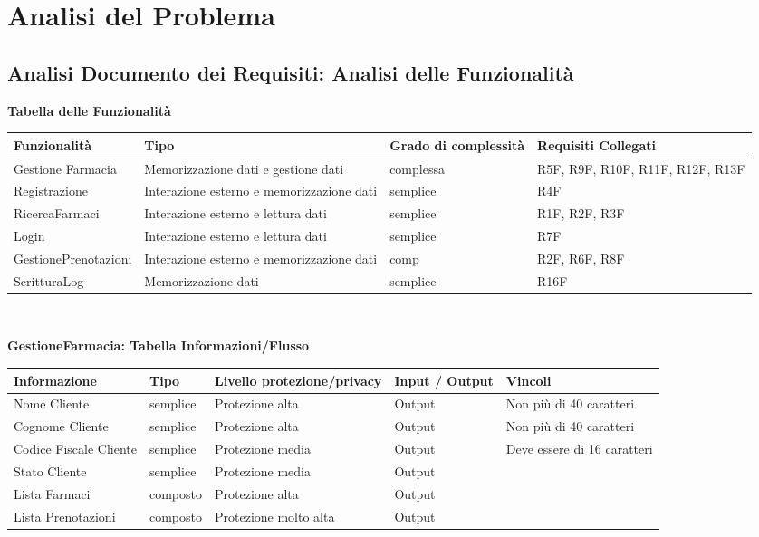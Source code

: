 \newpage
\section{Analisi del Problema}
\subsection{Analisi Documento dei Requisiti: Analisi delle Funzionalità}
\hfill \break

\textbf{Tabella delle Funzionalità}
\hfill \break

\begin{tabular} {|P{4cm}|P{4cm}|P{3.5cm}|P{4cm}|} %
    \hline
    \textbf{Funzionalità} & \textbf{Tipo} & \textbf{Grado di complessità} & \textbf{Requisiti Collegati} \\
    \hline
    Gestione Farmacia & Memorizzazione dati e gestione dati & complessa & R5F, R9F, R10F, R11F, R12F, R13F \\
    \hline
    Registrazione & Interazione esterno e memorizzazione dati & semplice & R4F \\
    \hline
    RicercaFarmaci  &  Interazione esterno e lettura dati  &  semplice  &   R1F, R2F, R3F \\
    \hline
    Login  &  Interazione esterno e lettura dati  &  semplice  &   R7F \\
    \hline
    GestionePrenotazioni  &  Interazione esterno e memorizzazione dati  &  comp  &   R2F, R6F, R8F \\
    \hline
    ScritturaLog  &  Memorizzazione dati  &  semplice  &   R16F \\
    \hline
\end{tabular}
\\
\hfill \break

\textbf{GestioneFarmacia: Tabella Informazioni/Flusso}
\hfill \break

\begin{tabular} {|P{3cm}|P{3cm}|P{3cm}|P{3cm}|P{3cm}|}
    \hline
    \textbf{Informazione} & \textbf{Tipo} & \textbf{Livello protezione/privacy} & \textbf{Input / Output} & \textbf{Vincoli}\\
    \hline
    Nome Cliente & semplice & Protezione alta & Output & Non più di 40 caratteri \\
    \hline
    Cognome Cliente & semplice & Protezione alta & Output & Non più di 40 caratteri \\
    \hline
    Codice Fiscale Cliente & semplice & Protezione media & Output & Deve essere di 16 caratteri \\
    \hline
    Stato Cliente & semplice & Protezione media & Output & \\
    \hline
    Lista Farmaci & composto & Protezione alta & Output & \\
    \hline
    Lista Prenotazioni & composto & Protezione molto alta & Output & \\
    \hline
\end{tabular}
\hfill \break

